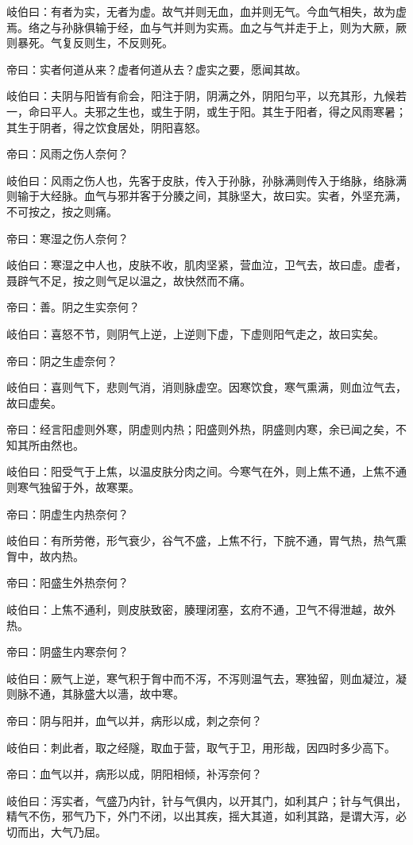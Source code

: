 \documentclass{article}%
\begin{document}
岐伯曰：有者为实，无者为虚。故气并则无血，血并则无气。今血气相失，故为虚焉。络之与孙脉俱输于经，血与气并则为实焉。血之与气并走于上，则为大厥，厥则暴死。气复反则生，不反则死。

帝曰：实者何道从来？虚者何道从去？虚实之要，愿闻其故。

岐伯曰：夫阴与阳皆有俞会，阳注于阴，阴满之外，阴阳匀平，以充其形，九候若一，命曰平人。夫邪之生也，或生于阴，或生于阳。其生于阳者，得之风雨寒暑；其生于阴者，得之饮食居处，阴阳喜怒。

帝曰：风雨之伤人奈何？

岐伯曰：风雨之伤人也，先客于皮肤，传入于孙脉，孙脉满则传入于络脉，络脉满则输于大经脉。血气与邪并客于分腠之间，其脉坚大，故曰实。实者，外坚充满，不可按之，按之则痛。

帝曰：寒湿之伤人奈何？

岐伯曰：寒湿之中人也，皮肤不收，肌肉坚紧，营血泣，卫气去，故曰虚。虚者，聂辟气不足，按之则气足以温之，故快然而不痛。

帝曰：善。阴之生实奈何？

岐伯曰：喜怒不节，则阴气上逆，上逆则下虚，下虚则阳气走之，故曰实矣。

帝曰：阴之生虚奈何？

岐伯曰：喜则气下，悲则气消，消则脉虚空。因寒饮食，寒气熏满，则血泣气去，故曰虚矣。

帝曰：经言阳虚则外寒，阴虚则内热；阳盛则外热，阴盛则内寒，余已闻之矣，不知其所由然也。

岐伯曰：阳受气于上焦，以温皮肤分肉之间。今寒气在外，则上焦不通，上焦不通则寒气独留于外，故寒栗。

帝曰：阴虚生内热奈何？

岐伯曰：有所劳倦，形气衰少，谷气不盛，上焦不行，下脘不通，胃气热，热气熏胷中，故内热。

帝曰：阳盛生外热奈何？

岐伯曰：上焦不通利，则皮肤致密，腠理闭塞，玄府不通，卫气不得泄越，故外热。

帝曰：阴盛生内寒奈何？

岐伯曰：厥气上逆，寒气积于胷中而不泻，不泻则温气去，寒独留，则血凝泣，凝则脉不通，其脉盛大以濇，故中寒。

帝曰：阴与阳并，血气以并，病形以成，刺之奈何？

岐伯曰：刺此者，取之经隧，取血于营，取气于卫，用形哉，因四时多少高下。

帝曰：血气以并，病形以成，阴阳相倾，补泻奈何？

岐伯曰：泻实者，气盛乃内针，针与气俱内，以开其门，如利其户；针与气俱出，精气不伤，邪气乃下，外门不闭，以出其疾，摇大其道，如利其路，是谓大泻，必切而出，大气乃屈。
\end{document}
